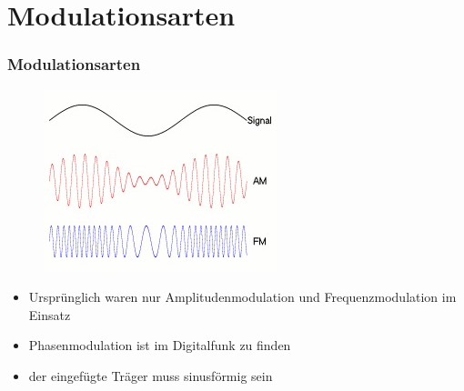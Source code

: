\section[Arten]{Modulationsarten}
\begin{frame}
  \frametitle{Modulationsarten}
  \begin{center}
    \begin{figure}
      \includegraphics[width=\textwidth,height=.5\textheight,keepaspectratio]{e14/modulationen.jpg}\\
    \end{figure}

    \begin{itemize}
      \item Ursprünglich waren nur Amplitudenmodulation und Frequenzmodulation im Einsatz
      \item Phasenmodulation ist im Digitalfunk zu finden
      \item der eingefügte Träger muss sinusförmig sein
    \end{itemize}
  \end{center}
\end{frame}

